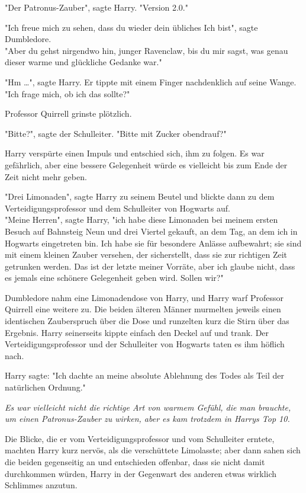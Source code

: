 {"Der Patronus-Zauber", sagte Harry. "Version 2.0."

"Ich freue mich zu sehen, dass du wieder dein übliches Ich bist", sagte Dumbledore.\\ "Aber du gehst nirgendwo hin, junger Ravenclaw, bis du mir sagst, was genau dieser warme und glückliche Gedanke war."

"Hm …", sagte Harry. Er tippte mit einem Finger nachdenklich auf seine Wange.\\ "Ich frage mich, ob ich das sollte?"

Professor Quirrell grinste plötzlich.

"Bitte?", sagte der Schulleiter. "Bitte mit Zucker obendrauf?"

Harry verspürte einen Impuls und entschied sich, ihm zu folgen. Es war gefährlich, aber eine bessere Gelegenheit würde es vielleicht bis zum Ende der Zeit nicht mehr geben.

"Drei Limonaden", sagte Harry zu seinem Beutel und blickte dann zu dem Verteidigungsprofessor und dem Schulleiter von Hogwarts auf.\\ "Meine Herren", sagte Harry, "ich habe diese Limonaden bei meinem ersten Besuch auf Bahnsteig Neun und drei Viertel gekauft, an dem Tag, an dem ich in Hogwarts eingetreten bin. Ich habe sie für besondere Anlässe aufbewahrt; sie sind mit einem kleinen Zauber versehen, der sicherstellt, dass sie zur richtigen Zeit getrunken werden. Das ist der letzte meiner Vorräte, aber ich glaube nicht, dass es jemals eine schönere Gelegenheit geben wird. Sollen wir?"

Dumbledore nahm eine Limonadendose von Harry, und Harry warf Professor Quirrell eine weitere zu. Die beiden älteren Männer murmelten jeweils einen identischen Zauberspruch über die Dose und runzelten kurz die Stirn über das Ergebnis. Harry seinerseits kippte einfach den Deckel auf und trank. Der Verteidigungsprofessor und der Schulleiter von Hogwarts taten es ihm höflich nach.

Harry sagte: "Ich dachte an meine absolute Ablehnung des Todes als Teil der natürlichen Ordnung."

\emph{Es war vielleicht nicht die richtige Art von warmem Gefühl, die man brauchte, um einen Patronus-Zauber zu wirken, aber es kam trotzdem in Harrys Top 10.}

Die Blicke, die er vom Verteidigungsprofessor und vom Schulleiter erntete, machten Harry kurz nervös, als die verschüttete Limolasste; aber dann sahen sich die beiden gegenseitig an und entschieden offenbar, dass sie nicht damit durchkommen würden, Harry in der Gegenwart des anderen etwas wirklich Schlimmes anzutun.

}
